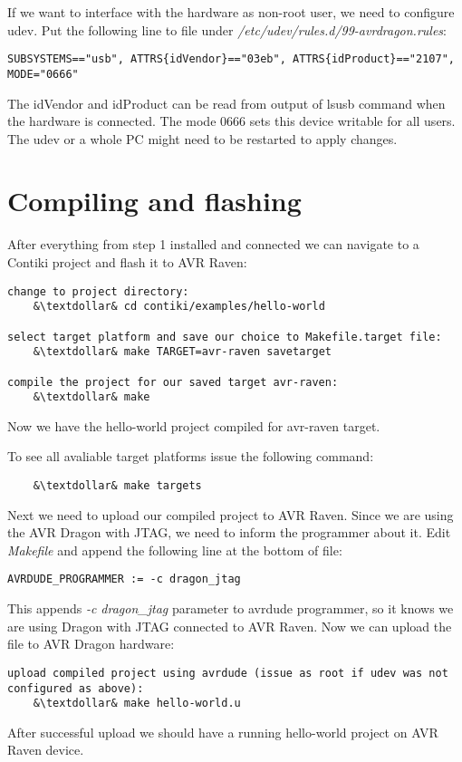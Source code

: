 \documentclass{article}
\begin{document}
If we want to interface with the hardware as non-root user, we need to configure udev.
Put the following line to file under {\it{/etc/udev/rules.d/99-avrdragon.rules}}:
\begin{lstlisting}
SUBSYSTEMS=="usb", ATTRS{idVendor}=="03eb", ATTRS{idProduct}=="2107", MODE="0666"
\end{lstlisting}
The idVendor and idProduct can be read from output of lsusb command when the hardware is connected.
The mode 0666 sets this device writable for all users.
The udev or a whole PC might need to be restarted to apply changes.


\section{Compiling and flashing}
After everything from step 1 installed and connected we can navigate to a Contiki project and flash it to AVR Raven:
\begin{lstlisting}
change to project directory:
	&\textdollar& cd contiki/examples/hello-world
	
select target platform and save our choice to Makefile.target file:
	&\textdollar& make TARGET=avr-raven savetarget
	
compile the project for our saved target avr-raven:
	&\textdollar& make
\end{lstlisting}
Now we have the hello-world project compiled for avr-raven target.

To see all avaliable target platforms issue the following command:
\begin{lstlisting}
	&\textdollar& make targets
\end{lstlisting}

Next we need to upload our compiled project to AVR Raven.
Since we are using the AVR Dragon with JTAG, we need to inform the programmer about it.
Edit {\it{Makefile}} and append the following line at the bottom of file:
\begin{lstlisting}
AVRDUDE_PROGRAMMER := -c dragon_jtag
\end{lstlisting}

This appends {\it{-c dragon\_jtag}} parameter to avrdude programmer, so it knows we are using Dragon with JTAG connected to AVR Raven.
Now we can upload the file to AVR Dragon hardware:
\begin{lstlisting}
upload compiled project using avrdude (issue as root if udev was not configured as above):
	&\textdollar& make hello-world.u
\end{lstlisting}
After successful upload we should have a running hello-world project on AVR Raven device.
\end{document}

